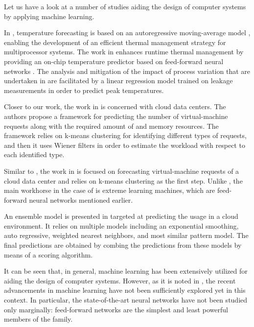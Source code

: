 Let us have a look at a number of studies aiding the design of computer systems
by applying machine learning.

In \cite{coskun2008}, temperature forecasting is based on an autoregressive
moving-average model \cite{hastie2009}, enabling the development of an efficient
thermal management strategy for multiprocessor systems. The work in
\cite{kumar2010} enhances runtime thermal management by providing an on-chip
temperature predictor based on feed-forward neural networks \cite{hastie2009}.
The analysis and mitigation of the impact of process variation that are
undertaken in \cite{juan2014} are facilitated by a linear regression model
\cite{hastie2009} trained on leakage measurements in order to predict peak
temperatures.

Closer to our work, the work in \cite{dabbagh2015} is concerned with cloud data
centers. The authors propose a framework for predicting the number of
virtual-machine requests along with the required amount of  and memory
resources. The framework relies on k-means clustering \cite{hastie2009} for
identifying different types of requests, and then it uses Wiener filters in
order to estimate the workload with respect to each identified type.

Similar to \cite{dabbagh2015}, the work in \cite{ismaeel2015} is focused on
forecasting virtual-machine requests of a cloud data center and relies on
k-means clustering as the first step. Unlike \cite{dabbagh2015}, the main
workhorse in the case of \cite{ismaeel2015} is extreme learning machines, which
are feed-forward neural networks mentioned earlier.

An ensemble model \cite{hastie2009} is presented in \cite{cao2014} targeted at
predicting the  usage in a cloud environment. It relies on multiple
models including an exponential smoothing, auto regressive, weighted nearest
neighbors, and most similar pattern model. The final predictions are obtained by
combing the predictions from these models by means of a scoring algorithm.

It can be seen that, in general, machine learning has been extensively utilized
for aiding the design of computer systems. However, as it is noted in
, the recent advancements in machine learning have not been
sufficiently explored yet in this context. In particular, the state-of-the-art
neural networks have not been studied only marginally: feed-forward networks are
the simplest and least powerful members of the family.

